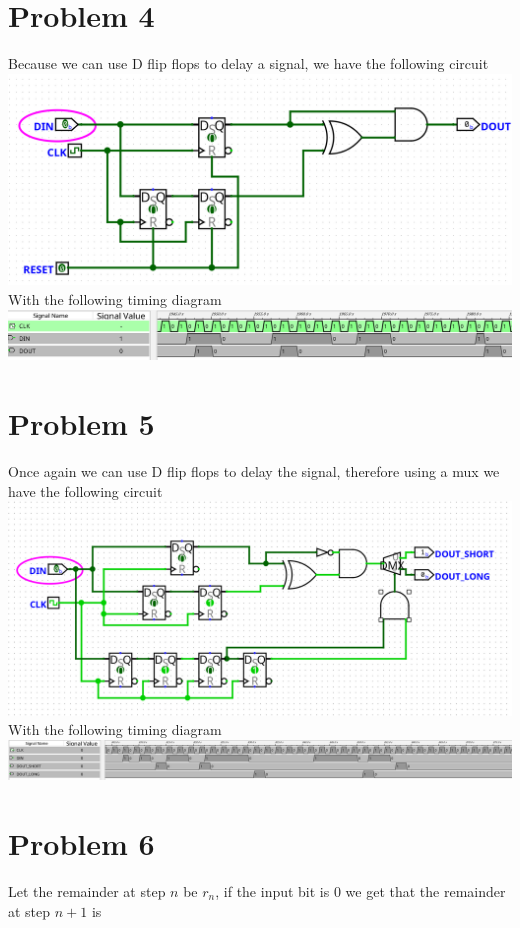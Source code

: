 \documentclass[12pt]{article}
\begin{document}
\section*{Problem 4}
Because we can use D flip flops to delay a signal, we have the following circuit
\\\includegraphics[scale=0.3]{Q4.png}
With the following timing diagram
\\\includegraphics[scale=0.2]{Q4timing.png}
\section*{Problem 5}
Once again we can use D flip flops to delay the signal, therefore using a mux we have the following circuit
\\\includegraphics[scale=0.27]{Q5.png}\\
With the following timing diagram
\\\includegraphics[scale=0.2]{Q5timing.png}
\section*{Problem 6}
Let the remainder at step $n$ be $r_n$, if the input bit is 0 we get that the remainder at step
$n+1$ is 
\end{document}
